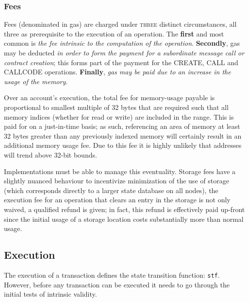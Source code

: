 \documentclass[10pt,letterpaper,leqno,bibliography=totoc]{scrartcl}
\newenvironment{alphafootnotes}
{\par\edef\savedfootnotenumber{\number\value{footnote}}
\renewcommand{\thefootnote}{\alph{footnote}}
\setcounter{footnote}{0}}
{\par\setcounter{footnote}{\savedfootnotenumber}}
\begin{document}
\begin{alphafootnotes}
\begin{multicols*}{2}
			\subsubsection{Fees} Fees (denominated in gas) are charged under \textsc{three} distinct circumstances, all three as prerequisite to the execution of an operation.\supercite{Wood2017} The \textbf{first} and most common is \textsl{the fee intrinsic to the computation of the operation}. \textbf{Secondly}, gas may be deducted \textsl{in order to form the payment for a subordinate message call or contract creation}; this forms part of the payment for the CREATE, CALL and CALLCODE operations. \textbf{Finally}, \textsl{gas may be paid due to an increase in the usage of the memory.} 


			Over an account’s execution, the total fee for memory-usage payable is proportional to smallest multiple of 32 bytes that are required such that all memory indices (whether for read or write) are included in the range. This is paid for on a just-in-time basis; as such, referencing an area of memory at least 32 bytes greater than any previously indexed memory will certainly result in an additional memory usage fee. Due to this fee it is highly unlikely that addresses will trend above 32-bit bounds.\supercite{Wood2017} 
					
			Implementations must be able to manage this eventuality. Storage fees have a slightly nuanced behaviour to incentivize minimization of the use of storage (which corresponds directly to a larger state database on all nodes), the execution fee for an operation that clears an entry in the storage is not only waived, a qualified refund is given; in fact, this refund is effectively paid up-front since the initial usage of a storage location costs substantially more than normal usage. \supercite{Wood2017}
					
			\subsection{Execution}
				The execution of a transaction defines the state transition function: \texttt{stf}. However, before any transaction can be executed it needs to go through the initial tests of intrinsic validity.

\end{multicols*}
\end{alphafootnotes}
\end{document}
